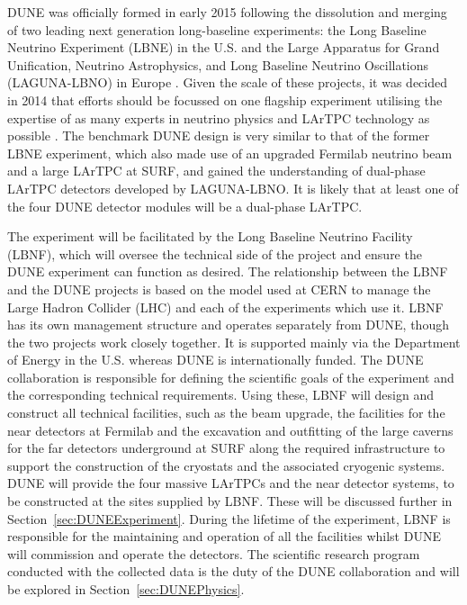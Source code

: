 DUNE was officially formed in early 2015 following the dissolution and merging of two leading next generation long-baseline experiments: the Long Baseline Neutrino Experiment (LBNE) in the U.S. \cite{LBNECDR1,LBNECDR3,LBNECDR4a} and the Large Apparatus for Grand Unification, Neutrino Astrophysics, and Long Baseline Neutrino Oscillations (LAGUNA-LBNO) in Europe \cite{LAGUNA-LBNO2015}.  Given the scale of these projects, it was decided in 2014 that efforts should be focussed on one flagship experiment utilising the expertise of as many experts in neutrino physics and LArTPC technology as possible \cite{P52014}.  The benchmark DUNE design is very similar to that of the former LBNE experiment, which also made use of an upgraded Fermilab neutrino beam and a large LArTPC at SURF, and gained the understanding of dual-phase LArTPC detectors developed by LAGUNA-LBNO.  It is likely that at least one of the four DUNE detector modules will be a dual-phase LArTPC.

The experiment will be facilitated by the Long Baseline Neutrino Facility (LBNF), which will oversee the technical side of the project and ensure the DUNE experiment can function as desired.  The relationship between the LBNF and the DUNE projects is based on the model used at CERN to manage the Large Hadron Collider (LHC) and each of the experiments which use it.  LBNF has its own management structure and operates separately from DUNE, though the two projects work closely together.  It is supported mainly via the Department of Energy in the U.S. whereas DUNE is internationally funded.  The DUNE collaboration is responsible for defining the scientific goals of the experiment and the corresponding technical requirements.  Using these, LBNF will design and construct all technical facilities, such as the beam upgrade, the facilities for the near detectors at Fermilab and the excavation and outfitting of the large caverns for the far detectors underground at SURF along the required infrastructure to support the construction of the cryostats and the associated cryogenic systems.  DUNE will provide the four massive LArTPCs and the near detector systems, to be constructed at the sites supplied by LBNF.  These will be discussed further in Section~\ref{sec:DUNEExperiment}.  During the lifetime of the experiment, LBNF is responsible for the maintaining and operation of all the facilities whilst DUNE will commission and operate the detectors.  The scientific research program conducted with the collected data is the duty of the DUNE collaboration and will be explored in Section~\ref{sec:DUNEPhysics}.

